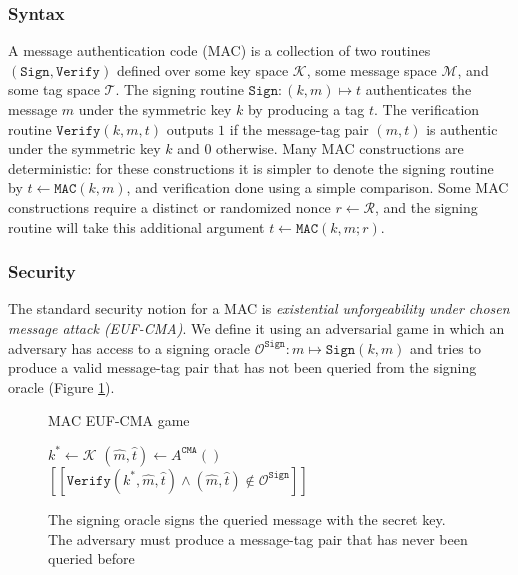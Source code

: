 \documentclass[runningheads]{llncs}
\newcommand{\mac}{\texttt{MAC}}
\newcommand{\sign}{\texttt{Sign}}
\newcommand{\verify}{\texttt{Verify}}
\newcommand{\llbrack}{[\![}
\newcommand{\rrbrack}{]\!]}
\begin{document}
\subsubsection{Syntax} A message authentication code (MAC) is a collection of two routines $(\sign, \verify)$ defined over some key space $\mathcal{K}$, some message space $\mathcal{M}$, and some tag space $\mathcal{T}$. The signing routine $\sign: (k, m) \mapsto t$ authenticates the message $m$ under the symmetric key $k$ by producing a tag $t$. The verification routine $\verify(k,m,t)$ outputs $1$ if the message-tag pair $(m, t)$ is authentic under the symmetric key $k$ and $0$ otherwise. Many MAC constructions are deterministic: for these constructions it is simpler to denote the signing routine by $t \leftarrow \mac(k, m)$, and verification done using a simple comparison. Some MAC constructions require a distinct or randomized nonce $r \leftarrow \mathcal{R}$, and the signing routine will take this additional argument $t \leftarrow \mac(k, m; r)$.

\subsubsection{Security} The standard security notion for a MAC is \textit{existential unforgeability under chosen message attack (EUF-CMA)}. We define it using an adversarial game in which an adversary has access to a signing oracle $\mathcal{O}^\sign: m \mapsto \sign(k, m)$ and tries to produce a valid message-tag pair that has not been queried from the signing oracle (Figure \ref{fig:euf-cma-game}).

\begin{figure}[h]
    \centering
    \begin{minipage}[t]{0.6\textwidth}
    \begin{algorithm}[H]
        \caption*{MAC EUF-CMA game}
        \begin{algorithmic}[1]
            \State $k^\ast \leftarrow \mathcal{K}$
            \State $(\hat{m}, \hat{t}) \leftarrow A^\texttt{CMA}()$
            \State \Return $\llbrack \verify(k^\ast, \hat{m}, \hat{t}) \land (\hat{m}, \hat{t}) \not\in \mathcal{O}^\sign \rrbrack$
        \end{algorithmic}
    \end{algorithm}
    \end{minipage}
    \caption{The signing oracle signs the queried message with the secret key. The adversary must produce a message-tag pair that has never been queried before}\label{fig:euf-cma-game}
\end{figure}
\end{document}
